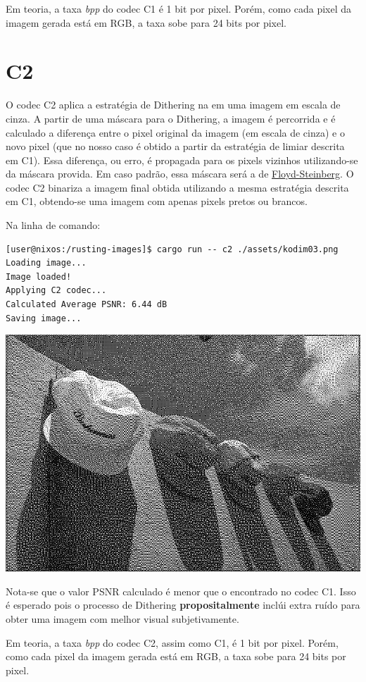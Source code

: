 \documentclass[11pt]{article}
\begin{document}
Em teoria, a taxa \emph{bpp} do codec C1 é 1 bit por pixel. Porém, como cada pixel da imagem gerada
está em RGB, a taxa sobe para 24 bits por pixel.

\section{C2}
\label{sec:org01e4d79}

O codec C2 aplica a estratégia de Dithering na em uma imagem em escala de cinza. A partir de uma
máscara para o Dithering, a imagem é percorrida e é calculado a diferença entre o pixel original
da imagem (em escala de cinza) e o novo pixel (que no nosso caso é obtido a partir da estratégia
de limiar descrita em C1). Essa diferença, ou erro, é propagada para os pixels vizinhos utilizando-se
da máscara provida. Em caso padrão, essa máscara será a de \href{https://en.wikipedia.org/wiki/Floyd\%E2\%80\%93Steinberg\_dithering}{Floyd-Steinberg}. O codec C2 binariza
a imagem final obtida utilizando a mesma estratégia descrita em C1, obtendo-se uma imagem com
apenas pixels pretos ou brancos.

Na linha de comando:

\begin{verbatim}
[user@nixos:/rusting-images]$ cargo run -- c2 ./assets/kodim03.png
Loading image...
Image loaded!
Applying C2 codec...
Calculated Average PSNR: 6.44 dB
Saving image...
\end{verbatim}

\begin{center}
\includegraphics[height=0.4\textwidth]{../assets/kodim03_c2.png}
\end{center}

Nota-se que o valor PSNR calculado é menor que o encontrado no codec C1. Isso é esperado pois
o processo de Dithering \textbf{propositalmente} inclúi extra ruído para obter uma imagem com melhor visual
subjetivamente.

Em teoria, a taxa \emph{bpp} do codec C2, assim como C1, é 1 bit por pixel. Porém, como cada pixel da imagem gerada
está em RGB, a taxa sobe para 24 bits por pixel.
\end{document}
